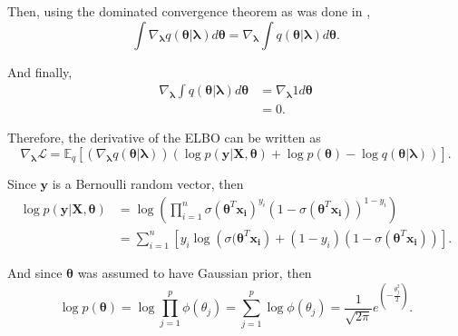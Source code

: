 Then, using the dominated convergence theorem as was done in \cite{ranganath2014black},
\begin{equation}
  \int \nabla_{\boldsymbol{\lambda}} q(\boldsymbol{\theta} | \boldsymbol{\lambda}) d\boldsymbol{\theta} =
    \nabla_{\boldsymbol{\lambda}} \int q(\boldsymbol{\theta} | \boldsymbol{\lambda}) d\boldsymbol{\theta}.
\end{equation}

And finally,
\begin{equation}
  \begin{split}
      \nabla_{\boldsymbol{\lambda}} \int q(\boldsymbol{\theta} | \boldsymbol{\lambda}) d\boldsymbol{\theta} &=
      \nabla_{\boldsymbol{\lambda}} 1 d\boldsymbol{\theta} \\
      &= 0.
  \end{split}
\end{equation}

Therefore, the derivative of the ELBO can be written as
\begin{equation}
  \nabla_{\boldsymbol{\lambda}} \mathcal{L} = \mathbb{E}_q \left[ \left( \nabla_{\boldsymbol{\lambda}} q(\boldsymbol{\theta} | \boldsymbol{\lambda}) \right) \left( \log p(\boldsymbol{y} | \boldsymbol{X}, \boldsymbol{\theta}) + \log p(\boldsymbol{\theta}) - \log q(\boldsymbol{\theta} | \boldsymbol{\lambda}) \right) \right].
\end{equation}

Since $\boldsymbol{y}$ is a Bernoulli random vector, then
\begin{equation}
  \begin{split}
      \log p(\boldsymbol{y} | \boldsymbol{X}, \boldsymbol{\theta}) &=
      \log \left( \prod_{i = 1}^n \sigma(\boldsymbol{\theta}^T \boldsymbol{x_i})^{y_i} (1 - \sigma(\boldsymbol{\theta}^T \boldsymbol{x_i}))^{1-y_i} \right) \\
      &= \sum_{i = 1}^n \left[ y_i \log \left( \sigma(\boldsymbol{\theta}^T \boldsymbol{x_i} \right) + (1 - y_i) (1 - \sigma(\boldsymbol{\theta}^T \boldsymbol{x_i})) \right].
  \end{split}
\end{equation}

And since $\boldsymbol{\theta}$ was assumed to have Gaussian prior, then
\begin{equation}
  \log p(\boldsymbol{\theta}) = \log \prod_{j = 1}^p \phi(\theta_j) = \sum_{j = 1}^p \log \phi(\theta_j) = \frac{1}{\sqrt{2 \pi}} e^{\left( -\frac{\theta_j^2}{2} \right)}.
\end{equation}

